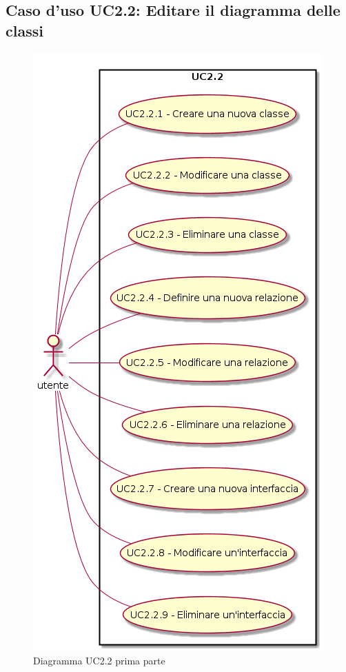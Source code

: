 \documentclass[../AnalisiDeiRequisiti.tex]{subfiles}
\begin{document}
	\subsection{Caso d'uso UC2.2: Editare il diagramma delle classi}
	\begin{figure} [H]
		\centering
		\includegraphics[scale=0.45]{./Figures/UC2-2a.png}
		\caption{Diagramma UC2.2 prima parte}\label{}
	\end{figure}
\end{document}
